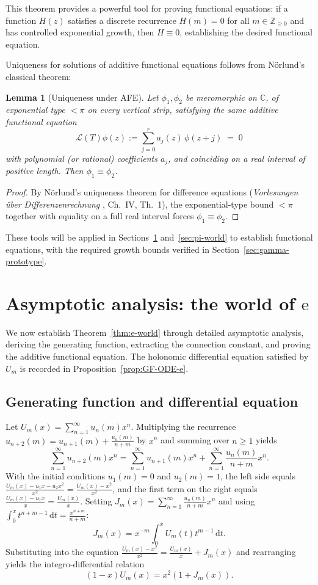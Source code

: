 \documentclass[11pt,reqno]{amsart}
\newtheorem{lemma}[theorem]{Lemma}
\theoremstyle{definition}
\newcommand{\N}{\mathbb{Z}_{\ge 0}}
\newcommand{\C}{\mathbb{C}}
\newcommand{\dd}{\mathrm{d}}
\newcommand{\ee}{\mathrm{e}}
\numberwithin{equation}{section}
\begin{document}
This theorem provides a powerful tool for proving functional equations: if a function $H(z)$ satisfies a discrete recurrence $H(m) = 0$ for all $m \in \N$ and has controlled exponential growth, then $H \equiv 0$, establishing the desired functional equation.

Uniqueness for solutions of additive functional equations follows from Nörlund's classical theorem:

\begin{lemma}[Uniqueness under AFE]\label{lem:unicity-norlund}
Let $\phi_1,\phi_2$ be meromorphic on $\C$, of exponential type $<\pi$ on every
vertical strip, satisfying the same additive functional equation
\[
  \mathcal{L}(T)\phi(z) := \sum_{j=0}^{r} a_j(z)\,\phi(z+j) \;=\; 0
\]
with polynomial (or rational) coefficients $a_j$, and coinciding on a real
interval of positive length. Then $\phi_1\equiv \phi_2$.
\end{lemma}

\begin{proof}
By Nörlund's uniqueness theorem for difference equations
(\emph{Vorlesungen über Differenzenrechnung} \cite{Norlund1924}, Ch.~IV, Th.~1),
the exponential-type bound $<\pi$ together with equality on a full real
interval forces $\phi_1\equiv \phi_2$.
\end{proof}

These tools will be applied in Sections~\ref{sec:e-world} and~\ref{sec:pi-world} to establish functional equations, with the required growth bounds verified in Section~\ref{sec:gamma-prototype}.

\section{Asymptotic analysis: the world of $\ee$}\label{sec:e-world}

We now establish Theorem~\ref{thm:e-world} through detailed asymptotic analysis, deriving the generating function, extracting the connection constant, and proving the additive functional equation.
The holonomic differential equation satisfied by $U_m$ is recorded in Proposition~\ref{prop:GF-ODE-e}.

\subsection{Generating function and differential equation}

Let $U_m(x) = \sum_{n=1}^\infty u_n(m) x^n$. Multiplying the recurrence $u_{n+2}(m) = u_{n+1}(m) + \frac{u_n(m)}{n+m}$ by $x^n$ and summing over $n \ge 1$ yields
\[
\sum_{n=1}^\infty u_{n+2}(m)x^n = \sum_{n=1}^\infty u_{n+1}(m)x^n + \sum_{n=1}^\infty \frac{u_n(m)}{n+m}x^n.
\]
With the initial conditions $u_1(m)=0$ and $u_2(m)=1$, the left side equals $\frac{U_m(x) - u_1x - u_2x^2}{x^2} = \frac{U_m(x) - x^2}{x^2}$, and the first term on the right equals $\frac{U_m(x) - u_1x}{x} = \frac{U_m(x)}{x}$. Setting $J_m(x) = \sum_{n=1}^\infty \frac{u_n(m)}{n+m}x^n$ and using $\int_0^x t^{n+m-1}\, \dd t = \frac{x^{n+m}}{n+m}$:
\[
J_m(x) = x^{-m}\int_0^x U_m(t)t^{m-1}\, \dd t.
\]
Substituting into the equation $\frac{U_m(x) - x^2}{x^2} = \frac{U_m(x)}{x} + J_m(x)$ and rearranging yields the integro-differential relation
\[
(1-x)U_m(x) = x^2(1 + J_m(x)).
\]
\end{document}
